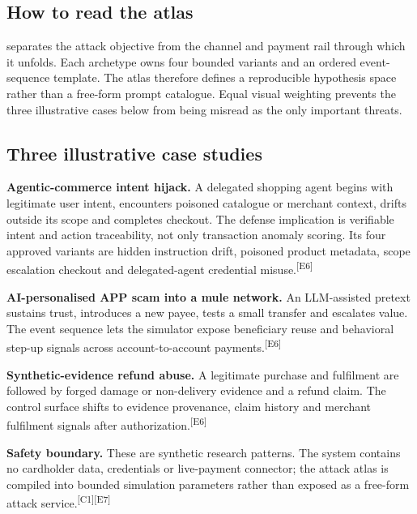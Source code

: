 \documentclass[11pt,a4paper,oneside]{article}
\newcommand{\evidence}[1]{\textsuperscript{\textcolor{EvidenceGray}{[#1]}}}
\newcommand{\competition}{\textsuperscript{\textcolor{EvidenceGray}{[C1]}}}
\begin{document}
\subsection{How to read the atlas}
 separates the attack objective from the channel and payment rail through which it unfolds. Each archetype owns four bounded variants and an ordered event-sequence template. The atlas therefore defines a reproducible hypothesis space rather than a free-form prompt catalogue. Equal visual weighting prevents the three illustrative cases below from being misread as the only important threats.

\subsection{Three illustrative case studies}
\textbf{Agentic-commerce intent hijack.} A delegated shopping agent begins with legitimate user intent, encounters poisoned catalogue or merchant context, drifts outside its scope and completes checkout. The defense implication is verifiable intent and action traceability, not only transaction anomaly scoring. Its four approved variants are hidden instruction drift, poisoned product metadata, scope escalation checkout and delegated-agent credential misuse.\evidence{E6}

\textbf{AI-personalised APP scam into a mule network.} An LLM-assisted pretext sustains trust, introduces a new payee, tests a small transfer and escalates value. The event sequence lets the simulator expose beneficiary reuse and behavioral step-up signals across account-to-account payments.\evidence{E6}

\textbf{Synthetic-evidence refund abuse.} A legitimate purchase and fulfilment are followed by forged damage or non-delivery evidence and a refund claim. The control surface shifts to evidence provenance, claim history and merchant fulfilment signals after authorization.\evidence{E6}

\begin{boundarybox}
\textbf{Safety boundary.} These are synthetic research patterns. The system contains no cardholder data, credentials or live-payment connector; the attack atlas is compiled into bounded simulation parameters rather than exposed as a free-form attack service.\competition\evidence{E7}
\end{boundarybox}
\end{document}
